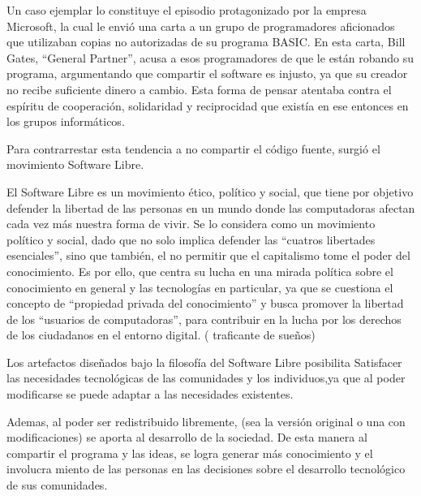 	Un caso ejemplar lo constituye el episodio protagonizado por la empresa Microsoft, la cual le envió una carta a un grupo de programadores	aficionados que utilizaban copias no autorizadas de su programa BASIC. En esta carta, Bill Gates, “General Partner”, acusa a esos programadores 
	de que le están robando su programa, argumentando que compartir el software es injusto, ya que su creador no recibe suficiente dinero a cambio. Esta forma de pensar atentaba contra el espíritu de cooperación, solidaridad y reciprocidad que existía en ese entonces en los grupos informáticos.\par
	
	Para contrarrestar esta tendencia a no compartir el código fuente, surgió
	el movimiento Software Libre.\par
	
	
	El Software Libre es un movimiento ético, político y social, que tiene por objetivo defender la libertad de las personas en un mundo donde las computadoras afectan cada vez más nuestra forma de vivir. Se lo considera como un movimiento político y social, dado que no solo implica defender las “cuatros libertades esenciales”, sino que también, el no permitir que el capitalismo tome el poder del conocimiento. Es por ello, que centra su lucha en una mirada política sobre el conocimiento en general y las tecnologías en particular, ya que se cuestiona el concepto de “propiedad privada del conocimiento” y busca promover la libertad de los “usuarios de computadoras”, para contribuir en la lucha por los derechos de los ciudadanos en el entorno digital. ( traficante de sueños)\par
	
	Los artefactos diseñados bajo la filosofía del Software Libre posibilita Satisfacer las necesidades tecnológicas de las comunidades y los individuos,ya que al poder modificarse se puede adaptar a las necesidades existentes.\par
	
	Ademas, al poder ser redistribuido libremente, (sea la versión original o una con modificaciones) se aporta al desarrollo de la sociedad. De esta manera al compartir el programa y las ideas, se logra generar más conocimiento y el involucra miento de las personas en las decisiones sobre el desarrollo tecnológico de sus comunidades.\par
	\vspace{1cm}
